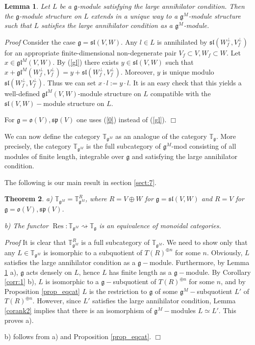 \documentclass[10pt]{amsart}
\newcounter{theorem}
\newtheorem{theo}{Theorem}[section]
\newtheorem{lemma}[theo]{Lemma}
\renewenvironment{proof}{ \emph{Proof}}{$\Box$}
\newcommand{\TT}{\mathbb{T}}
\renewcommand{\sp}{\mathfrak{sp}}
\renewcommand{\sl}{\mathfrak{sl}}
\newcommand{\oo}{\mathfrak{o}}
\renewcommand{\gg}{\mathfrak{g}}
\newcommand{\gl}{\mathfrak{gl}}
\begin{document}
\begin{lemma}\label{corank1} Let $L$ be a $\gg$-module satisfying the large annihilator condition. Then the $\gg$-module
structure on $L$ extends in a unique way to a $\gg^M$-module structure such that $L$ satisfies  the large annihilator condition as a $\gg^M$-module.
\end{lemma}

\begin{proof} Consider the case $\gg=\sl(V,W)$. Any $l\in L$ is annihilated by $\sl(W_f^\perp,V_f^\perp)$ for an appropriate finite-dimensional non-degenerate pair $V_f \subset V, W_f \subset W$.
Let $x\in \gl^M(V,W)$.
By (\ref{gl}) there exists $y\in \sl(V,W)$ such that $x+\gl^M(W_f^\perp,V_f^\perp)=y+\sl(W_f^\perp,V_f^\perp)$. Moreover, $y$ is unique modulo $\sl(W_f^\perp,V_f^\perp)$. Thus we can set $x \cdot l:=y \cdot l$. It is an easy check that this yields a well-defined $\gl^M(V,W)$-module structure on $L$ compatible with the $\sl(V,W)-$module structure on $L$. 

For $\gg = \oo(V),\sp(V)$ one uses (\ref{0}) instead of (\ref{gl}).
\end{proof}


\vspace{0.33cm}

We can now define the category $\TT_{\gg^M}$ as an analogue of the category $\TT_\gg$. More precisely, the category $\TT_{\gg^M}$ is the full subcategory of $\gg^M$-mod consisting of all modules of finite length, 
integrable over $\gg$ and satisfying the large annihilator condition.

The following is our main result in section \ref{sect:7}.
\begin{theo}\label{mainres_sect7}
 a) $\TT_{\gg^M} = \TT_{\gg^M}^R$, where $R = V\oplus W$ for $\gg = \sl(V,W)$ and $R=V$ for $\gg = \oo(V), \sp(V)$.
 
 b) The functor $\operatorname{Res}:\TT_{\gg^M} \rightsquigarrow \TT_\gg$ is an equivalence of monoidal categories.
\end{theo}
\begin{proof}
 It is clear that $\TT_{\gg^M}^R$ is a full subcategory of $\TT_{\gg^M}$. We need to show only that any $L \in \TT_{\gg^M}$ is isomorphic to a subquotient of $T(R)^{\oplus n}$ for some $n$. Obviously, $L$ satisfies the large annihilator condition as a $\gg-$module. Furthermore, by Lemma \ref{corank1} a), $\gg$ acts densely on $L$, hence $L$ has finite length as a $\gg-$module. By Corollary \ref{corr:1} b), $L$ is isomorphic to a $\gg-$subquotient of $T(R)^{\oplus n}$ for some $n$, and by Proposition \ref{prop_eqcat} $L$ is the restriction to $\gg$ of some $\gg^M-$subquotient $L'$ of $T(R)^{\oplus n}$. However, since $L'$ satisfies the large annihilator condition, Lemma \ref{corank2} implies that there is an isomorphism of $\gg^M-$modules $L\simeq L'$. This proves a).
 
 b) follows from a) and Proposition \ref{prop_eqcat}.
\end{proof}
\end{document}

